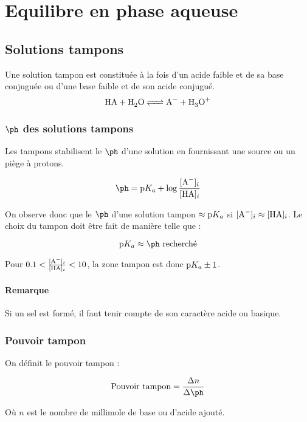 \section{Equilibre en phase aqueuse}
\subsection{Solutions tampons}
Une solution tampon est constituée à la fois d'un acide faible et de sa base conjuguée ou d'une base faible et de son acide conjugué.
\[ \ce{HA + H2O <=> A- + H3O+} \]

\subsubsection{$\ph$ des solutions tampons}
Les tampons stabilisent le $\ph$ d'une solution en fournissant une source ou un piège à protons.

$$\ph = \pka + \log{\frac{{[\ce{A-}]_i}}{{[\ce{HA}]_i}}}$$

On observe donc que le $\ph$ d'une solution tampon $\approx \mathrm{p}K_a$ si $[\ce{A-}]_i \approx [\ce{HA}]_i$.
Le choix du tampon doit être fait de manière telle que :

\[ \pka \approx \ph \text{ recherché} \]

Pour $0.1 < \frac{{[\ce{A-}]_i}}{{[\ce{HA}]_i}} < 10$, la zone tampon est donc $\mathrm{p}K_a \pm 1$.

\paragraph{Remarque}
Si un sel est formé, il faut tenir compte de son caractère acide ou basique.

\subsubsection{Pouvoir tampon}
On définit le pouvoir tampon :

\[ \text{Pouvoir tampon} = \frac{\Delta n}{\Delta\ph} \]

Où $n$ est le nombre de millimole de base ou d'acide ajouté.

